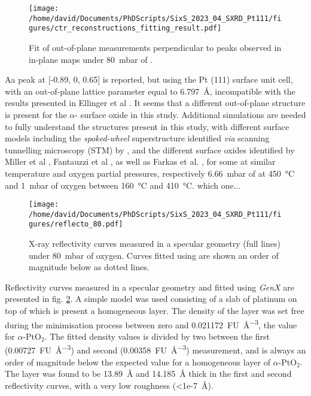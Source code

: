 \begin{figure}[!htb]
    \centering
    \texttt{[image: /home/david/Documents/PhDScripts/SixS\_2023\_04\_SXRD\_Pt111/figures/ctr\_reconstructions\_fitting\_result.pdf]}
    \caption{
        Fit of out-of-plane measurements perpendicular to peaks observed in in-plane maps under \qty{80}{\milli\bar} of .
    }
    \label{fig:LScans80Fit}
\end{figure}

Aa peak at [-0.89, 0, 0.65] is reported, but using the Pt (111) surface unit cell, with an out-of-plane lattice parameter equal to \qty{6.797}{\angstrom}, incompatible with the results presented in Ellinger et al \parencite*{Ellinger2008}.
It seems that a different out-of-plane structure is present for the $\alpha$- surface oxide in this study.
Additional simulations are needed to fully understand the structures present in this study, with different surface models including the \textit{spoked-wheel} superstructure identified \textit{via} scanning tunnelling microscopy (STM) by \cite{VanSpronsen2017, Boden2022}, and the different surface oxides identified by Miller et al \parencite*{Miller2011, Miller2014}, Fantauzzi et al \parencite*{Fantauzzi2017}, as well as Farkas et al. \parencite*{Farkas2017}, for some at similar temperature and oxygen partial pressures, respectively \qty{6.66}{\milli\bar} of  at \qty{450}{\degreeCelsius} and \qty{1}{\milli\bar} of oxygen between \qty{160}{\degreeCelsius} and \qty{410}{\degreeCelsius}.
\textcolor{Important}{which one...}

\begin{figure}[!htb]
    \centering
    \texttt{[image: /home/david/Documents/PhDScripts/SixS\_2023\_04\_SXRD\_Pt111/figures/reflecto\_80.pdf]}
    \caption{
    	X-ray reflectivity curves measured in a specular geometry (full lines) under \qty{80}{\milli\bar} of oxygen.
    	Curves fitted using  are shown an order of magnitude below as dotted lines.
    }
    \label{fig:Reflecto80}
\end{figure}

Reflectivity curves measured in a specular geometry and fitted using \textit{GenX} \parencite{Bjorck2007, Glavic2022} are presented in fig. \ref{fig:Reflecto80}.
A simple model was used consisting of a slab of platinum on top of which is present a homogeneous layer.
The density of the layer was set free during the minimisation process between zero and \qty{0.021172}{FU\per\cubic\angstrom}, the value for $\alpha$-PtO$_2$.
The fitted density values is divided by two between the first (\qty{0.00727}{FU\per\cubic\angstrom}) and second (\qty{0.00358}{FU\per\cubic\angstrom}) measurement, and is always an order of magnitude below the expected value for a homogeneous layer of $\alpha$-PtO$_2$.
The layer was found to be \qty{13.89}{\angstrom} and \qty{14.185}{\angstrom} thick in the first and second reflectivity curves, with a very low roughness (\qty{<1e-7}{\angstrom}).

